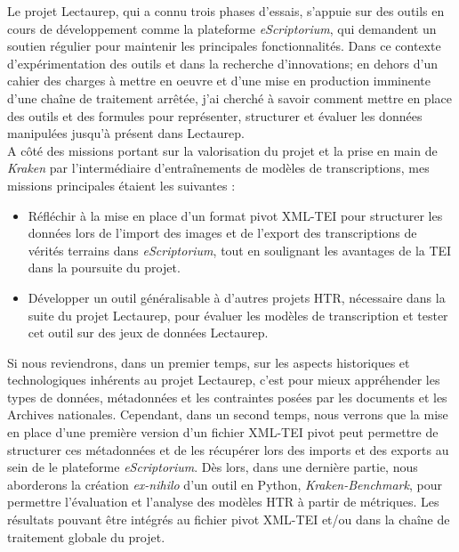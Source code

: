 Le projet Lectaurep, qui a connu trois phases d'essais, s'appuie sur des outils en cours de développement comme la plateforme \textit{eScriptorium}, qui demandent un soutien régulier pour maintenir les principales fonctionnalités. Dans ce contexte d'expérimentation des outils et dans la recherche d'innovations; en dehors d'un cahier des charges à mettre en oeuvre et d'une mise en production imminente d'une chaîne de traitement arrêtée, j'ai cherché à savoir comment mettre en place des outils et des formules pour représenter, structurer et évaluer les données manipulées jusqu'à présent dans Lectaurep.\\ 

A côté des missions portant sur la valorisation du projet et la prise en main de \textit{Kraken} par l'intermédiaire d'entraînements de modèles de transcriptions, mes missions principales étaient les suivantes : 
\begin{itemize}
    \item Réfléchir à la mise en place d'un format pivot XML-TEI pour structurer les données lors de l'import des images et de l'export des transcriptions de vérités terrains dans \textit{eScriptorium}, tout en soulignant les avantages de la TEI dans la poursuite du projet.
    \item Développer un outil généralisable à d'autres projets HTR, nécessaire dans la suite du projet Lectaurep, pour évaluer les modèles de transcription et tester cet outil sur des jeux de données Lectaurep. 
\end{itemize}

Si nous reviendrons, dans un premier temps, sur les aspects historiques et technologiques inhérents au projet Lectaurep, c'est pour mieux appréhender les types de données, métadonnées et les contraintes posées par les documents et les Archives nationales. Cependant, dans un second temps, nous verrons que la mise en place d'une première version d'un fichier XML-TEI pivot peut permettre de structurer ces métadonnées et de les récupérer lors des imports et des exports au sein de le plateforme \textit{eScriptorium}. Dès lors, dans une dernière partie, nous aborderons la création \textit{ex-nihilo} d'un outil en Python, \textit{Kraken-Benchmark}, pour permettre l'évaluation et l'analyse des modèles HTR à partir de métriques. Les résultats pouvant être intégrés au fichier pivot XML-TEI et/ou dans la chaîne de traitement globale du projet.


